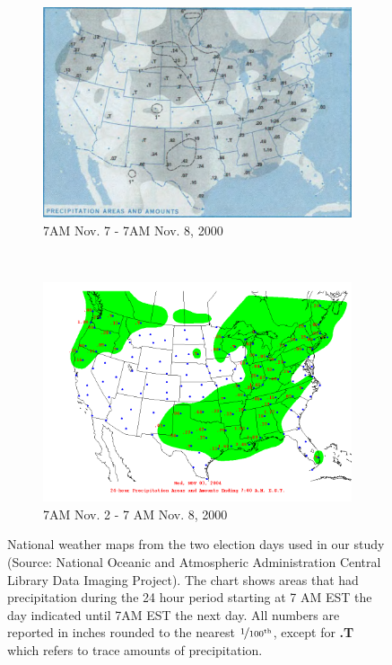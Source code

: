 \begin{figure}[t]
    \centering
    \begin{subfigure}[b]{0.45\textwidth}
        \includegraphics[width=\textwidth]{Figures/Election_2000_wednesday.png}
        \caption{7AM Nov. 7 - 7AM Nov. 8, 2000}
        \label{fig:gull}
    \end{subfigure}
    ~ %
    \begin{subfigure}[b]{0.45\textwidth}
        \includegraphics[width=\textwidth]{Figures/precip_20041103.png}
        \caption{7AM Nov. 2 - 7 AM Nov. 8, 2000}
        \label{fig:tiger}
    \end{subfigure}
    \caption{National weather maps from the two election days used in our study (Source: National Oceanic and Atmospheric Administration Central Library Data Imaging Project). The chart shows areas that had precipitation during the 24 hour period starting at 7 AM EST the day indicated until 7AM EST the next day. All numbers are reported in inches rounded to the nearest $\nicefrac{1}{100^{\mathrm{th}}}$, except for \textbf{.T} which refers to trace amounts of precipitation.}\label{fig:precipitation}
\end{figure}